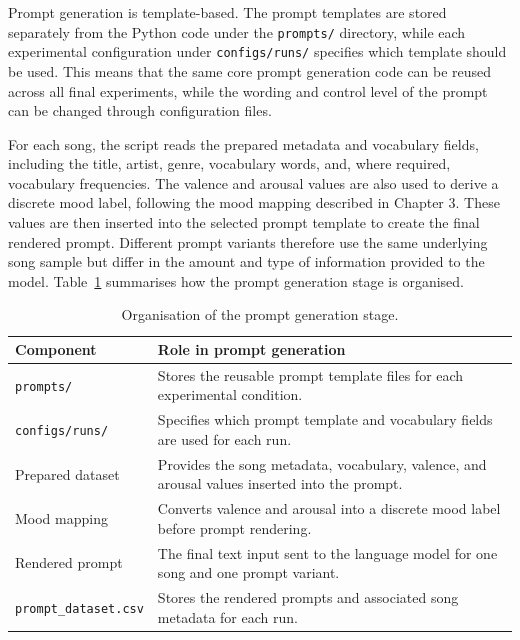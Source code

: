 Prompt generation is template-based. The prompt templates are stored separately from the Python code under the \texttt{prompts/} directory, while each experimental configuration under \texttt{configs/runs/} specifies which template should be used. This means that the same core prompt generation code can be reused across all final experiments, while the wording and control level of the prompt can be changed through configuration files.

For each song, the script reads the prepared metadata and vocabulary fields, including the title, artist, genre, vocabulary words, and, where required, vocabulary frequencies. The valence and arousal values are also used to derive a discrete mood label, following the mood mapping described in Chapter 3. These values are then inserted into the selected prompt template to create the final rendered prompt. Different prompt variants therefore use the same underlying song sample but differ in the amount and type of information provided to the model. Table~\ref{tab:prompt_generation_organisation} summarises how the prompt generation stage is organised.

\begin{table}[H]
\centering
\renewcommand{\arraystretch}{1.2}
\caption{Organisation of the prompt generation stage.}
\label{tab:prompt_generation_organisation}
\begin{tabular}{
>{\raggedright\arraybackslash}p{}
>{\raggedright\arraybackslash}p{}
}
\hline
Component & Role in prompt generation \\
\hline
\texttt{prompts/} & Stores the reusable prompt template files for each experimental condition. \\
\texttt{configs/runs/} & Specifies which prompt template and vocabulary fields are used for each run. \\
Prepared dataset & Provides the song metadata, vocabulary, valence, and arousal values inserted into the prompt. \\
Mood mapping & Converts valence and arousal into a discrete mood label before prompt rendering. \\
Rendered prompt & The final text input sent to the language model for one song and one prompt variant. \\
\texttt{prompt\_dataset.csv} & Stores the rendered prompts and associated song metadata for each run. \\
\hline
\end{tabular}
\renewcommand{\arraystretch}{1.0}
\end{table}


